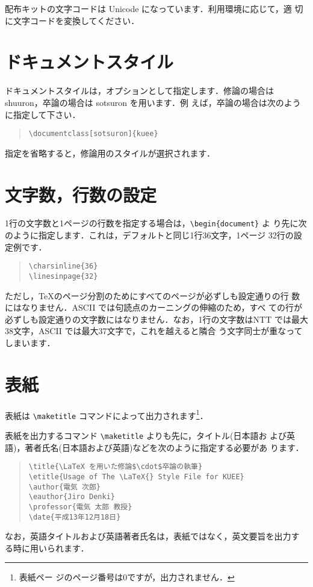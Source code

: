 \documentclass[sotsuron]{kuee}
\begin{document}
配布キットの文字コードは Unicode になっています．利用環境に応じて，適
切に文字コードを変換してください．


\section{ドキュメントスタイル}

ドキュメントスタイルは，オプションとして指定します．修論の場合は
{\ttfamily shuuron}，卒論の場合は {\ttfamily sotsuron} を用います．例
えば，卒論の場合は次のように指定して下さい．
\begin{quote}
\begin{verbatim}
\documentclass[sotsuron]{kuee}
\end{verbatim}
\end{quote}
指定を省略すると，修論用のスタイルが選択されます．


\section{文字数，行数の設定}

1行の文字数と1ページの行数を指定する場合は，\verb+\begin{document}+ よ
り先に次のように指定します．これは，デフォルトと同じ1行36文字，1ページ
32行の設定例です．
\begin{quote}
\begin{verbatim}
\charsinline{36}
\linesinpage{32}
\end{verbatim}
\end{quote}
ただし，\TeX のページ分割のためにすべてのページが必ずしも設定通りの行
数にはなりません．ASCII \JTeX では句読点のカーニングの伸縮のため，すべ
ての行が必ずしも設定通りの文字数にはなりません．なお，1行の文字数はNTT
\JTeX では最大38文字，ASCII \JTeX では最大37文字で，これを越えると隣合
う文字同士が重なってしまいます．


\section{表紙}
表紙は \verb+\maketitle+ コマンドによって出力されます\footnote{表紙ペー
ジのページ番号は0ですが，出力されません．}．

表紙を出力するコマンド \verb+\maketitle+ よりも先に，タイトル(日本語お
よび英語)，著者氏名(日本語および英語)などを次のように指定する必要があ
ります．
\begin{quote}
\begin{verbatim}
\title{\LaTeX を用いた修論$\cdot$卒論の執筆}
\etitle{Usage of The \LaTeX{} Style File for KUEE}
\author{電気 次郎}
\eauthor{Jiro Denki}
\professor{電気 太郎 教授}
\date{平成13年12月18日}
\end{verbatim}
\end{quote}
なお，英語タイトルおよび英語著者氏名は，表紙ではなく，英文要旨を出力す
る時に用いられます．
\end{document}
